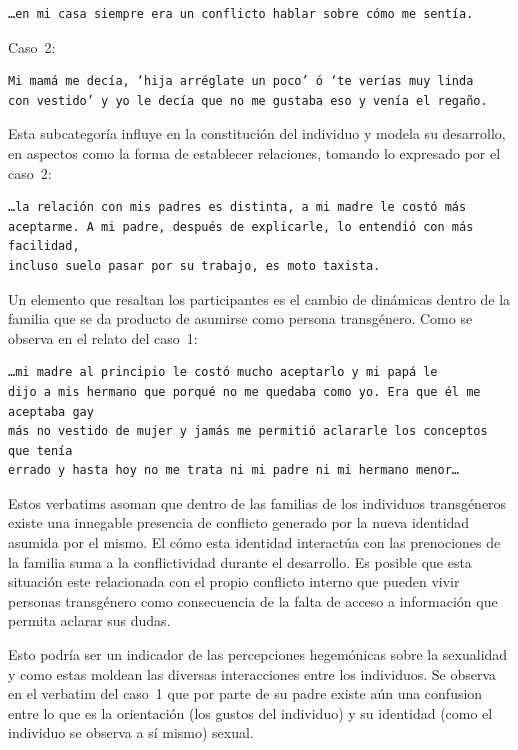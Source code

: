 \begin{verbatim}
…en mi casa siempre era un conflicto hablar sobre cómo me sentía.
\end{verbatim}

Caso~2:

\begin{verbatim}
Mi mamá me decía, ‘hija arréglate un poco’ ó ‘te verías muy linda
con vestido’ y yo le decía que no me gustaba eso y venía el regaño.
\end{verbatim}

Esta subcategoría influye en la constitución del individuo y modela su
desarrollo, en aspectos como la forma de establecer relaciones,
tomando lo expresado por el caso~2:

\begin{verbatim}
…la relación con mis padres es distinta, a mi madre le costó más
aceptarme. A mi padre, después de explicarle, lo entendió con más facilidad,
incluso suelo pasar por su trabajo, es moto taxista.
\end{verbatim}

Un elemento que resaltan los participantes es el cambio de dinámicas dentro de
la familia que se da producto de asumirse como persona transgénero. Como se observa en
el relato del caso~1:

\begin{verbatim}
…mi madre al principio le costó mucho aceptarlo y mi papá le
dijo a mis hermano que porqué no me quedaba como yo. Era que él me aceptaba gay
más no vestido de mujer y jamás me permitió aclararle los conceptos que tenía
errado y hasta hoy no me trata ni mi padre ni mi hermano menor…
\end{verbatim}

Estos verbatims asoman que dentro de las familias de los individuos transgéneros
existe una innegable presencia de conflicto generado por la nueva identidad
asumida por el mismo. El cómo esta identidad interactúa con las prenociones de
la familia suma a la conflictividad durante el desarrollo. Es posible que esta
situación este relacionada con el propio conflicto interno que pueden vivir
personas transgénero como consecuencia de la falta de acceso a información que
permita aclarar sus dudas.

Esto podría ser un indicador de las percepciones hegemónicas sobre la sexualidad
y como estas moldean las diversas interacciones entre los individuos. Se
observa en el verbatim del caso~1 que por parte de su padre existe aún una
confusion entre lo que es la orientación (los gustos del individuo) y su
identidad (como el individuo se observa a sí mismo) sexual.

